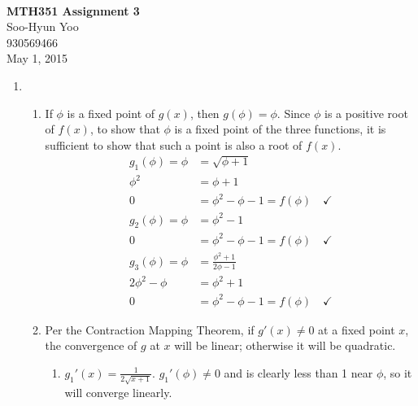 \documentclass[12pt,letterpaper]{article}
\begin{document}
\fancyfoot{}
\begin{center}
  \hfill \\
  \vspace{4in}
  {\bf\Huge MTH351 Assignment 3} \\
  \vspace{2in}
  {\Large Soo-Hyun Yoo \\ 930569466 \\ May 1, 2015}
\end{center}

\newpage
{}

\begin{enumerate}
  \item
    \begin{enumerate}
      \item If $\phi$ is a fixed point of $g(x)$, then $g(\phi) = \phi$. Since
        $\phi$ is a positive root of $f(x)$, to show that $\phi$ is a fixed
        point of the three functions, it is sufficient to show that such
        a point is also a root of $f(x)$.
        \begin{align*}
          g_1(\phi) = \phi &= \sqrt{\phi+1} \\
                    \phi^2 &= \phi+1 \\
                         0 &= \phi^2 - \phi - 1 = f(\phi) \quad \checkmark
        \end{align*}
        \begin{align*}
          g_2(\phi) = \phi &= \phi^2-1 \\
                         0 &= \phi^2 - \phi - 1 = f(\phi) \quad \checkmark
        \end{align*}
        \begin{align*}
          g_3(\phi) = \phi &= \frac{\phi^2+1}{2\phi-1} \\
              2\phi^2-\phi &= \phi^2+1 \\
                         0 &= \phi^2 - \phi - 1 = f(\phi) \quad \checkmark
        \end{align*}
      \item Per the Contraction Mapping Theorem, if $g'(x)\neq0$ at a fixed
        point $x$, the convergence of $g$ at $x$ will be linear; otherwise it
        will be quadratic.
        \begin{enumerate}
          \item $g_1'(x) = \frac{1}{2\sqrt{x+1}}$. $g_1'(\phi) \neq 0$ and is
            clearly less than 1 near $\phi$, so it will converge linearly.

\end{enumerate}
\end{enumerate}
\end{enumerate}
\end{document}
